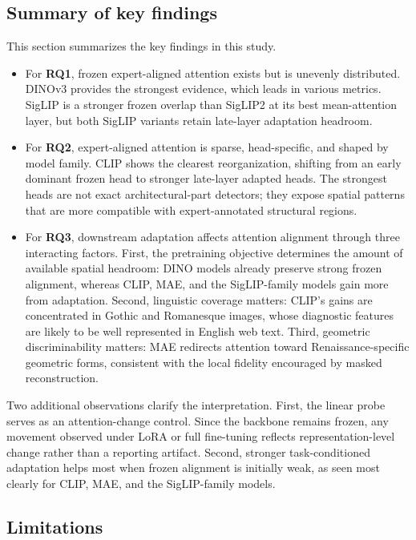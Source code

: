 \documentclass[lineno,pdflatex,sn-mathphys-num]{sn-jnl}%
\theoremstyle{thmstyleone}%
\theoremstyle{thmstyletwo}%
\theoremstyle{thmstylethree}%
\begin{document}
\subsection{Summary of key findings}

This section summarizes the key findings in this study.
\begin{itemize}
\item For \textbf{RQ1}, frozen expert-aligned attention exists but is unevenly distributed. DINOv3 provides the strongest evidence, which leads in various metrics. SigLIP is a stronger frozen overlap than SigLIP2 at its best mean-attention layer, but both SigLIP variants retain late-layer adaptation headroom.
\item For \textbf{RQ2}, expert-aligned attention is sparse, head-specific, and shaped by model family. CLIP shows the clearest reorganization, shifting from an early dominant frozen head to stronger late-layer adapted heads. The strongest heads are not exact architectural-part detectors; they expose spatial patterns that are more compatible with expert-annotated structural regions.
\item For \textbf{RQ3}, downstream adaptation affects attention alignment through three interacting factors. First, the pretraining objective determines the amount of available spatial headroom: DINO models already preserve strong frozen alignment, whereas CLIP, MAE, and the SigLIP-family models gain more from adaptation. Second, linguistic coverage matters: CLIP's gains are concentrated in Gothic and Romanesque images, whose diagnostic features are likely to be well represented in English web text. Third, geometric discriminability matters: MAE redirects attention toward Renaissance-specific geometric forms, consistent with the local fidelity encouraged by masked reconstruction.
\end{itemize}

Two additional observations clarify the interpretation. First, the linear probe serves as an attention-change control. Since the backbone remains frozen, any movement observed under LoRA or full fine-tuning reflects representation-level change rather than a reporting artifact. Second, stronger task-conditioned adaptation helps most when frozen alignment is initially weak, as seen most clearly for CLIP, MAE, and the SigLIP-family models.

\subsection{Limitations}
\end{document}
